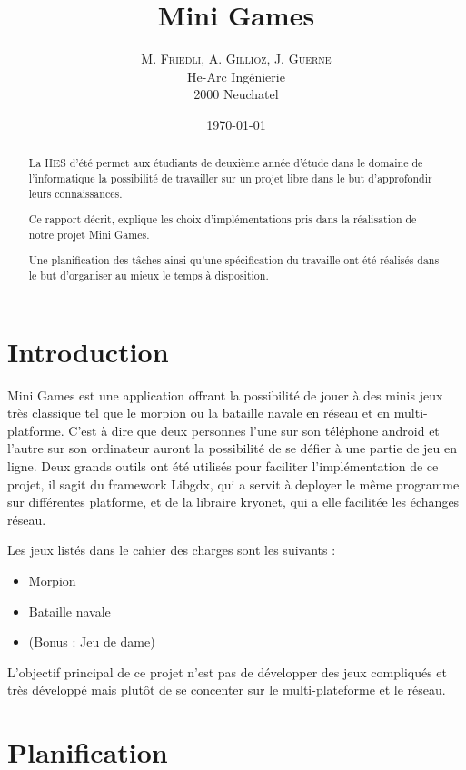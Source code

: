 \documentclass{report}
\title{Mini Games}
\author{M. \textsc{Friedli}, A. \textsc{Gillioz}, J. \textsc{Guerne}\\
He-Arc Ingénierie\\
2000 Neuchatel}
\date{\today{}}
\begin{document}
\maketitle{}

\begin{abstract}
La HES d'été permet aux étudiants de deuxième année d'étude dans le domaine de l'informatique
la possibilité de travailler sur un projet libre dans le but d'approfondir leurs connaissances.

Ce rapport décrit, explique les choix d'implémentations pris dans la réalisation de notre
projet Mini Games.

Une planification des tâches ainsi qu'une spécification du travaille ont été réalisés dans le but
d'organiser au mieux le temps à disposition.
\end{abstract}
\tableofcontents

\chapter{Introduction}
Mini Games est une application offrant la possibilité de jouer à des minis jeux très classique tel
que le morpion ou la bataille navale en réseau et en multi-platforme. C'est à dire que deux personnes
l'une sur son téléphone android et l'autre sur son ordinateur auront la possibilité de se défier à une partie de jeu en ligne.
Deux grands outils ont été utilisés pour faciliter l'implémentation de ce projet, il sagit du framework Libgdx, qui a servit à
deployer le même programme sur différentes platforme, et de la libraire kryonet, qui a elle facilitée les échanges réseau.

Les jeux listés dans le cahier des charges sont les suivants :
\begin{itemize}
	\item Morpion
	\item Bataille navale
	\item (Bonus : Jeu de dame)
\end{itemize}
L'objectif principal de ce projet n'est pas de développer des jeux compliqués et très
développé mais plutôt de se concenter sur le multi-plateforme et le réseau.

\chapter{Planification}
\end{document}
